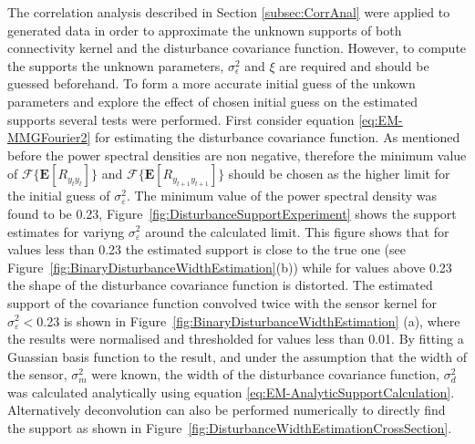 \documentclass[]{article}
\begin{document}
The correlation analysis described in Section \ref{subsec:CorrAnal} were applied to generated data in order to approximate the unknown supports of both connectivity kernel and the disturbance covariance function. However, to compute the supports the unknown parameters, $\sigma_{\epsilon}^2$ and $\xi$ are required and should be guessed beforehand.  To form a more accurate initial guess of the unkown parameters and explore the effect of chosen initial guess on the estimated supports several tests were performed. First consider equation \eqref{eq:EM-MMGFourier2} for estimating the disturbance covariance function. As mentioned before the power spectral densities are non negative, therefore the minimum value of $\mathcal F \{\mathbf E\left[ R_{y_ty_t}\right] \}$ and $\mathcal F \{\mathbf E\left[ R_{y_{t+1}y_{t+1}}\right]\}$ should be chosen as the higher limit for the initial guess of $\sigma^2_{\varepsilon}$. The minimum value of the power spectral density was found to be 0.23, Figure~\ref{fig:DisturbanceSupportExperiment} shows the support estimates for variyng  $\sigma^2_{\varepsilon}$ around the calculated limit. This figure shows that for values less than 0.23 the estimated support is close to the true one (see Figure~\ref{fig:BinaryDisturbanceWidthEstimation}(b)) while for values above 0.23 the shape of the disturbance covariance function is distorted. The estimated support of the covariance function convolved twice with the sensor kernel for  $\sigma^2_{\varepsilon}<$0.23 is shown in Figure~\ref{fig:BinaryDisturbanceWidthEstimation} (a), where the results were normalised and thresholded for values less than 0.01. By fitting a Guassian basis function to the result, and under the assumption that the width of the sensor, $\sigma_m^2$ were known, the width of the disturbance covariance function, $\sigma_d^2$ was calculated analytically using equation \eqref{eq:EM-AnalyticSupportCalculation}. Alternatively deconvolution can also be performed numerically to directly find the support as shown in Figure~\ref{fig:DisturbanceWidthEstimationCrossSection}.
\end{document}
